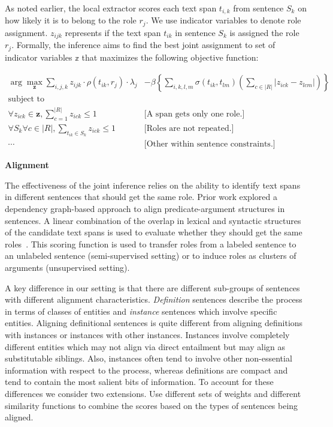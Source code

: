 As noted earlier, the local extractor scores each text span $t_{i,k}$ from sentence $S_k$ on how likely it is to belong to the role $r_j$. We use indicator variables to denote role assignment. $z_{ijk}$ represents if the text span $t_{ik}$ in sentence $S_k$ is assigned the role $r_j$. Formally, the inference aims to find the best joint assignment to set of indicator variables $\mathbb{z}$ that maximizes the following objective function:

\begin{align*}
 \arg\max_{\mathbf{z}}  \sum_{i,j,k} z_{ijk} \cdot \rho(t_{ik}, r_j) \cdot \lambda_{j}
	&- \beta \left\{ \sum_{i,k,l,m} \sigma(t_{ik}, t_{lm}) \left(\sum_{c \in |R|} |z_{ick} - z_{lcm}| \right) \right\}\\
\mbox{subject to} \\
\forall z_{ick} \in \mathbf{z}, \sum_{c = 1}^{|R|} z_{ick} \le 1  &\mbox{[A span gets only one role.]}\\
\forall S_k \forall c \in |R|, \sum_{t_{ik} \in S_k} z_{ick} \le 1  & \mbox{[Roles are not repeated.]} \\
 \cdots&  \mbox{[Other within sentence constraints.]}
\end{align*}

{\bf Alignment}

The effectiveness of the joint inference relies on the ability to identify text spans in different sentences that should get the same role. 
Prior work explored a dependency graph-based approach to align predicate-argument structures in sentences. A linear combination of the overlap in lexical and syntactic structures of the candidate text spans is used to evaluate whether they should get the same roles~\cite{furstenau-emnlp2009,furstenau2012semi,lang-naacl2010}.
This scoring function is used to transfer roles from a labeled sentence to an unlabeled sentence (semi-supervised setting) or to induce roles as clusters of arguments (unsupervised setting). 

A key difference in our setting is that there are different sub-groups of sentences with different alignment characteristics. 
{\em Definition} sentences describe the process in terms of classes of entities and {\em instance} sentences which involve specific entities.
Aligning definitional sentences is quite different from aligning definitions with instances or instances with other instances. 
Instances involve completely different entities which may not align via direct entailment but may align as substitutable siblings.
Also, instances often tend to involve other non-essential information with respect to the process, 
whereas definitions are compact and tend to contain the most salient bits of information. 
To account for these differences we consider two extensions. Use different sets of weights and different similarity functions to combine the scores based on the types of sentences being aligned.

